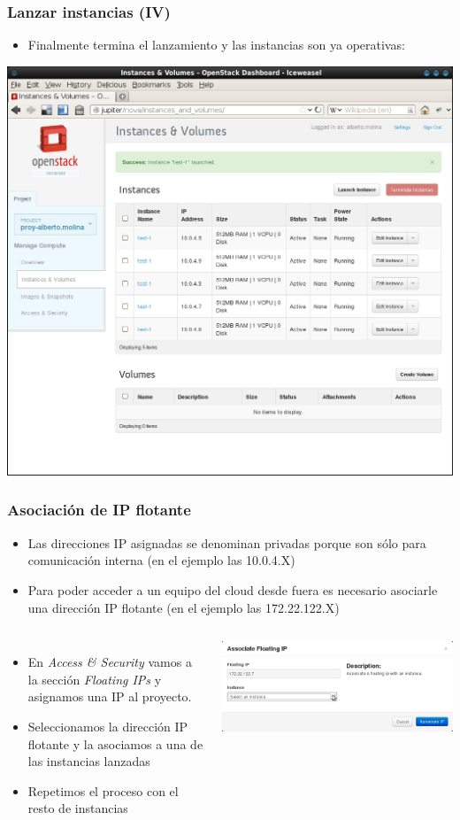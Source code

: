 \documentclass{beamer}
\begin{document}
\begin{frame}
  \frametitle{Lanzar instancias (IV)}
  \begin{itemize}
  \item Finalmente termina el lanzamiento y las instancias son ya operativas:
  \end{itemize}
  \begin{center}
    \includegraphics[width=.6\textwidth]{../img/horizon8.png}
  \end{center}
\end{frame}

\begin{frame}
  \frametitle{Asociación de IP flotante}
  \begin{itemize}
  \item Las direcciones IP asignadas se denominan privadas porque son sólo para
    comunicación interna (en el ejemplo las 10.0.4.X)
  \item Para poder acceder a un equipo del cloud desde fuera es necesario
    asociarle una dirección IP flotante (en el ejemplo las 172.22.122.X)
  \end{itemize}
  \begin{columns}
    \begin{itemize}
    \item En \textit{Access \& Security} vamos a la sección \textit{Floating
        IPs} y asignamos una IP al proyecto.
    \item Seleccionamos la dirección IP flotante y la asociamos a una de las
      instancias lanzadas
    \item Repetimos el proceso con el resto de instancias
    \end{itemize}
    \begin{center}
      \includegraphics[width=\columnwidth]{../img/horizon9.png}
    \end{center}
  \end{columns}
\end{frame}
\end{document}
